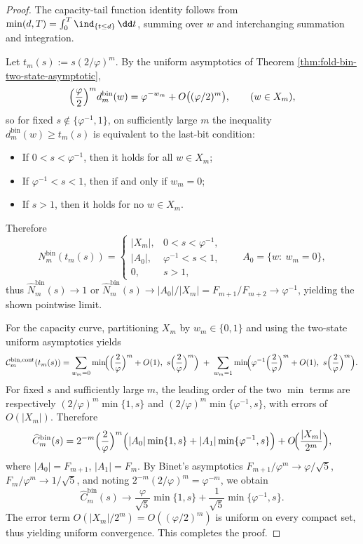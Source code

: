 \begin{proof}
The capacity-tail function identity follows from \(\min(d,T)=\int_0^T\ind_{\{t\le d\}}\,\dd t\), summing over \(w\) and interchanging summation and integration.
\par
Let \(t_m(s):=s(2/\varphi)^m\).
By the uniform asymptotics of Theorem \ref{thm:fold-bin-two-state-asymptotic},
\[
\Bigl(\frac{\varphi}{2}\Bigr)^m d^{\mathrm{bin}}_m(w)=\varphi^{-w_m}+O\bigl((\varphi/2)^m\bigr),
\qquad (w\in X_m),
\]
so for fixed \(s\notin\{\varphi^{-1},1\}\), on sufficiently large \(m\) the inequality
\(
d^{\mathrm{bin}}_m(w)\ge t_m(s)
\)
is equivalent to the last-bit condition:
\begin{itemize}
  \item If \(0<s<\varphi^{-1}\), then it holds for all \(w\in X_m\);
  \item If \(\varphi^{-1}<s<1\), then if and only if \(w_m=0\);
  \item If \(s>1\), then it holds for no \(w\in X_m\).
\end{itemize}
Therefore
\[
N^{\mathrm{bin}}_m(t_m(s))
=
\begin{cases}
|X_m|,& 0<s<\varphi^{-1},\\
|A_0|,& \varphi^{-1}<s<1,\\
0,& s>1,
\end{cases}
\qquad A_0=\{w:\ w_m=0\},
\]
thus
\(
\widehat N^{\mathrm{bin}}_m(s)\to 1
\)
or
\(
\widehat N^{\mathrm{bin}}_m(s)\to |A_0|/|X_m|=F_{m+1}/F_{m+2}\to \varphi^{-1}
\), yielding the shown pointwise limit.
\par
For the capacity curve, partitioning \(X_m\) by \(w_m\in\{0,1\}\) and using the two-state uniform asymptotics yields
\[
\mathcal{C}^{\mathrm{bin,cont}}_m(t_m(s))
=\sum_{w_m=0}\min\!\Bigl(\Bigl(\frac{2}{\varphi}\Bigr)^m+O(1),\ s\Bigl(\frac{2}{\varphi}\Bigr)^m\Bigr)
\;+\;
\sum_{w_m=1}\min\!\Bigl(\varphi^{-1}\Bigl(\frac{2}{\varphi}\Bigr)^m+O(1),\ s\Bigl(\frac{2}{\varphi}\Bigr)^m\Bigr).
\]
For fixed \(s\) and sufficiently large \(m\), the leading order of the two \(\min\) terms are respectively \((2/\varphi)^m\min\{1,s\}\) and \((2/\varphi)^m\min\{\varphi^{-1},s\}\), with errors of \(O(|X_m|)\).
Therefore
\[
\widehat C^{\mathrm{bin}}_m(s)
=2^{-m}\Bigl(\frac{2}{\varphi}\Bigr)^m\Bigl(|A_0|\min\{1,s\}+|A_1|\min\{\varphi^{-1},s\}\Bigr)+O\!\Bigl(\frac{|X_m|}{2^m}\Bigr),
\]
where \(|A_0|=F_{m+1}\), \(|A_1|=F_m\).
By Binet's asymptotics \(F_{m+1}/\varphi^m\to \varphi/\sqrt5\), \(F_m/\varphi^m\to 1/\sqrt5\), and noting
\(
2^{-m}(2/\varphi)^m=\varphi^{-m}
\), we obtain
\[
\widehat C^{\mathrm{bin}}_m(s)\to \frac{\varphi}{\sqrt5}\min\{1,s\}+\frac{1}{\sqrt5}\min\{\varphi^{-1},s\}.
\]
The error term \(O(|X_m|/2^m)=O((\varphi/2)^m)\) is uniform on every compact set, thus yielding uniform convergence. This completes the proof.
\end{proof}

